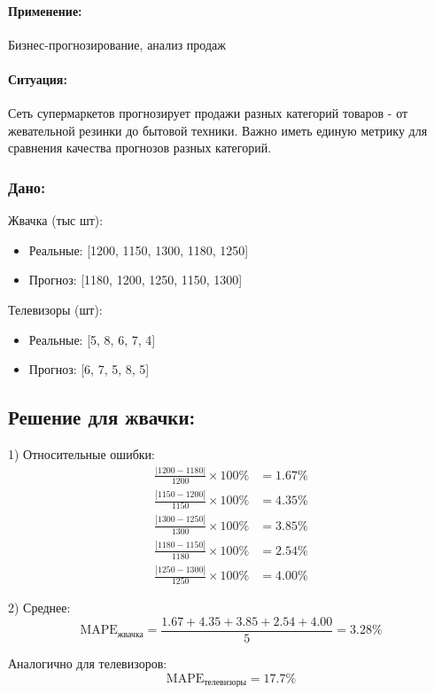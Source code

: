 \paragraph{Применение:} Бизнес-прогнозирование, анализ продаж

\paragraph{Ситуация:} Сеть супермаркетов прогнозирует продажи разных категорий товаров - от жевательной резинки до бытовой техники. Важно иметь единую метрику для сравнения качества прогнозов разных категорий.

\subsubsection*{Дано:}

Жвачка (тыс шт):
\begin{itemize}
    \item Реальные: [1200, 1150, 1300, 1180, 1250]
    \item Прогноз: [1180, 1200, 1250, 1150, 1300]
\end{itemize}

Телевизоры (шт):
\begin{itemize}
    \item Реальные: [5, 8, 6, 7, 4]
    \item Прогноз: [6, 7, 5, 8, 5]
\end{itemize}

\subsection*{Решение для жвачки:}
1) Относительные ошибки:
\begin{align*}
\frac{|1200-1180|}{1200} \times 100\% &= 1.67\% \\
\frac{|1150-1200|}{1150} \times 100\% &= 4.35\% \\
\frac{|1300-1250|}{1300} \times 100\% &= 3.85\% \\
\frac{|1180-1150|}{1180} \times 100\% &= 2.54\% \\
\frac{|1250-1300|}{1250} \times 100\% &= 4.00\%
\end{align*}


2) Среднее:
\[
\text{MAPE}_{\text{жвачка}} = \frac{1.67 + 4.35 + 3.85 + 2.54 + 4.00}{5} = 3.28\%
\]

Аналогично для телевизоров:
\[
\text{MAPE}_{\text{телевизоры}} = 17.7\%
\]

